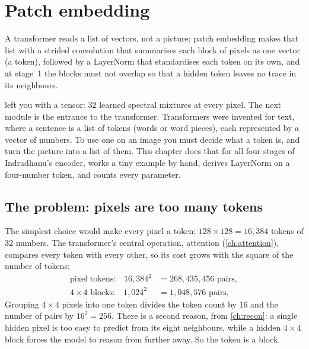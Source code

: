 \chapter{Patch embedding}\label{ch:patchembed}

\begin{onething}
A transformer reads a list of vectors, not a picture; patch embedding makes that list with a strided
convolution that summarises each block of pixels as one vector (a token), followed by a LayerNorm that
standardises each token on its own, and at stage~1 the blocks must not overlap so that a hidden token
leaves no trace in its neighbours.
\end{onething}

 left you with a  tensor: 32 learned spectral mixtures at
every pixel. The next module is the entrance to the transformer. Transformers were invented for text,
where a sentence is a list of tokens (words or word pieces), each represented by a vector of numbers.
To use one on an image you must decide what a token is, and turn the picture into a list of them. This
chapter does that for all four stages of Indradhanu's encoder, works a tiny example by hand, derives
LayerNorm on a four-number token, and counts every parameter.

\section{The problem: pixels are too many tokens}\label{sec:patchembed:problem}

The simplest choice would make every pixel a token: $128\times128 = 16{,}384$ tokens of 32 numbers. The
transformer's central operation, attention (\cref{ch:attention}), compares every token with every
other, so its cost grows with the square of the number of tokens:
\begin{align*}
\text{pixel tokens:}\quad 16{,}384^2 &= 268{,}435{,}456 \text{ pairs},\\
\text{$4\times4$ blocks:}\quad 1{,}024^2 &= 1{,}048{,}576 \text{ pairs}.
\end{align*}
Grouping $4\times4$ pixels into one token divides the token count by 16 and the number of pairs by
$16^2 = 256$\tagC. There is a second reason, from \cref{ch:recon}: a single hidden pixel is too easy to
predict from its eight neighbours, while a hidden $4\times4$ block forces the model to reason from
further away. So the token is a block.

